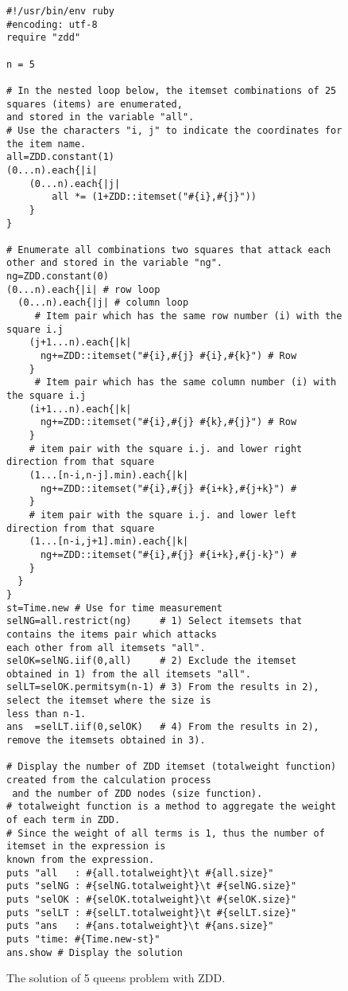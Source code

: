 \begin{figure}[!hbt]
{\small
\begin{Verbatim}[baselinestretch=0.7,frame=single]
#!/usr/bin/env ruby
#encoding: utf-8
require "zdd"

n = 5

# In the nested loop below, the itemset combinations of 25 squares (items) are enumerated, 
and stored in the variable "all".
# Use the characters "i, j" to indicate the coordinates for the item name.
all=ZDD.constant(1)
(0...n).each{|i|
	(0...n).each{|j|
		all *= (1+ZDD::itemset("#{i},#{j}"))
	}
}

# Enumerate all combinations two squares that attack each other and stored in the variable "ng".
ng=ZDD.constant(0)
(0...n).each{|i| # row loop
  (0...n).each{|j| # column loop
     # Item pair which has the same row number (i) with the square i.j
    (j+1...n).each{|k|
      ng+=ZDD::itemset("#{i},#{j} #{i},#{k}") # Row
    }
     # Item pair which has the same column number (i) with the square i.j
    (i+1...n).each{|k|
      ng+=ZDD::itemset("#{i},#{j} #{k},#{j}") # Row
    }
    # item pair with the square i.j. and lower right direction from that square
    (1...[n-i,n-j].min).each{|k|
      ng+=ZDD::itemset("#{i},#{j} #{i+k},#{j+k}") #
    }
    # item pair with the square i.j. and lower left direction from that square
    (1...[n-i,j+1].min).each{|k|
      ng+=ZDD::itemset("#{i},#{j} #{i+k},#{j-k}") #
    }
  }
}
st=Time.new # Use for time measurement
selNG=all.restrict(ng)     # 1) Select itemsets that contains the items pair which attacks 
each other from all itemsets "all".
selOK=selNG.iif(0,all)     # 2) Exclude the itemset obtained in 1) from the all itemsets "all".
selLT=selOK.permitsym(n-1) # 3) From the results in 2), select the itemset where the size is 
less than n-1.
ans  =selLT.iif(0,selOK)   # 4) From the results in 2), remove the itemsets obtained in 3).

# Display the number of ZDD itemset (totalweight function) created from the calculation process
 and the number of ZDD nodes (size function).
# totalweight function is a method to aggregate the weight of each term in ZDD.
# Since the weight of all terms is 1, thus the number of itemset in the expression is 
known from the expression. 
puts "all   : #{all.totalweight}\t #{all.size}"
puts "selNG : #{selNG.totalweight}\t #{selNG.size}"
puts "selOK : #{selOK.totalweight}\t #{selOK.size}"
puts "selLT : #{selLT.totalweight}\t #{selLT.size}"
puts "ans   : #{ans.totalweight}\t #{ans.size}"
puts "time: #{Time.new-st}"
ans.show # Display the solution 
\end{Verbatim}
}
\caption{The solution of 5 queens problem with ZDD. \label{fig:tut_nqueen_scp1}}
\end{figure}


